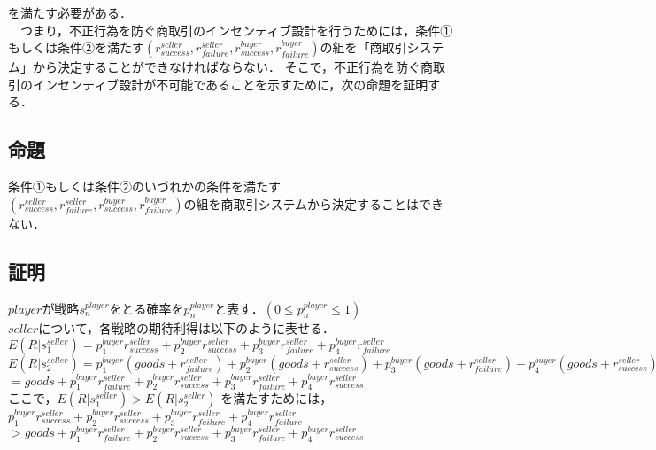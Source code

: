   を満たす必要がある．\\

  　つまり，不正行為を防ぐ商取引のインセンティブ設計を行うためには，条件①もしくは条件②を満たす$(r^{seller}_{success}, r^{seller}_{failure}, r^{buyer}_{success}, r^{buyer}_{failure})$の組を「商取引システム」から決定することができなければならない．
  そこで，不正行為を防ぐ商取引のインセンティブ設計が不可能であることを示すために，次の命題を証明する．

\subsection{命題}
条件①もしくは条件②のいづれかの条件を満たす$(r^{seller}_{success}, r^{seller}_{failure}, r^{buyer}_{success}, r^{buyer}_{failure})$の組を商取引システムから決定することはできない．

\subsection{証明}
$player$が戦略$s^{player}_n$をとる確率を$p^{player}_{n}$と表す．$(0 \leq p^{player}_{n} \leq 1)$\\

$seller$について，各戦略の期待利得は以下のように表せる．　\\
$E(R|s^{seller}_1)=p^{buyer}_1{r}^{seller}_{success}+p^{buyer}_2r^{seller}_{suceess}+p^{buyer}_3r^{seller}_{failure}+p^{buyer}_4r^{seller}_{failure}$ \\

$ E(R |s^{seller}_2) = p^{buyer}_1 (goods + r^{seller}_{failure}) + p^{buyer}_2 (goods + r^{seller}_{success}) + p^{buyer}_3 (goods + r^{seller}_{failure} ) + p^{buyer}_4 (goods + r^{seller}_{success})$ \\

$ = goods + p^{buyer}_1 r^{seller}_{failure} + p^{buyer}_2 r^{seller}_{success} + p^{buyer}_3 r^{seller}_{failure} + p^{buyer}_4 r^{seller}_{success}$ \\

ここで，$E(R |s^{seller}_1) > E(R |s^{seller}_2)$ を満たすためには， \\
$p^{buyer}_1 {r}^{seller}_{success} + p^{buyer}_2 r^{seller}_{suceess} + p^{buyer}_3 r^{seller}_{failure} + p^{buyer}_4 r^{seller}_{failure}$ \\

$ > goods + p^{buyer}_1 r^{seller}_{failure} + p^{buyer}_2 r^{seller}_{success} + p^{buyer}_3 r^{seller}_{failure} + p^{buyer}_4 r^{seller}_{success}$ \\

